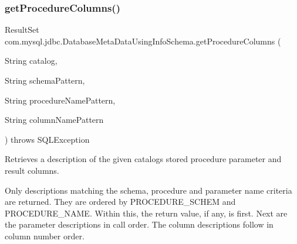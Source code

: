 \subsubsection{\texorpdfstring{get\+Procedure\+Columns()}{getProcedureColumns()}}
{\footnotesize\ttfamily Result\+Set com.\+mysql.\+jdbc.\+Database\+Meta\+Data\+Using\+Info\+Schema.\+get\+Procedure\+Columns (\begin{DoxyParamCaption}\item[{String}]{catalog,  }\item[{String}]{schema\+Pattern,  }\item[{String}]{procedure\+Name\+Pattern,  }\item[{String}]{column\+Name\+Pattern }\end{DoxyParamCaption}) throws S\+Q\+L\+Exception}

Retrieves a description of the given catalog\textquotesingle{}s stored procedure parameter and result columns.

Only descriptions matching the schema, procedure and parameter name criteria are returned. They are ordered by P\+R\+O\+C\+E\+D\+U\+R\+E\+\_\+\+S\+C\+H\+EM and P\+R\+O\+C\+E\+D\+U\+R\+E\+\_\+\+N\+A\+ME. Within this, the return value, if any, is first. Next are the parameter descriptions in call order. The column descriptions follow in column number order.

